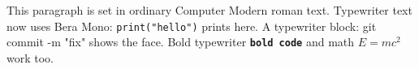 \documentclass{article}
\begin{document}
This paragraph is set in ordinary Computer Modern roman text.
Typewriter text now uses Bera Mono: \texttt{print("hello")} prints here.
A typewriter block: {\ttfamily git commit -m "fix"} shows the face.
Bold typewriter \texttt{\textbf{bold code}} and math $E = mc^2$ work too.
\end{document}
